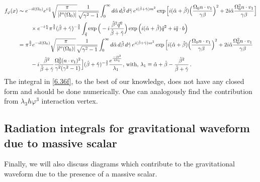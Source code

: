 \begin{align}
    \begin{split}
       f_{\varphi}(x)&\sim e^{-il(\Omega_0)}e^{i\frac{\pi}{4}}\sqrt{\frac{\pi}{|l''(\Omega_0)|}}\frac{1}{\sqrt{\gamma^2-1}}\int_0^\infty d\hat\alpha\,d\hat\beta\,d\hat\gamma \,e^{i(\hat\beta+\hat\gamma) m^2}\exp\Big[i(\hat\alpha+\hat\beta)\Big(\frac{\Omega_0 n\cdot v_1}{\gamma\beta}\Big)^2+2i\hat\alpha\frac{\Omega_0^2n\cdot v_1}{\gamma\beta}\Big]\\ &
       \hspace{0.8cm}\times  e^{-i\frac{\pi}{4}}\pi^{\frac{3}{2}}(\hat\beta+\hat\gamma)^{-\frac{3}{2}}\int_{\tilde q}\exp\Big(-i \frac{\hat\beta^2 \vec q^2}{\hat\beta +\hat\gamma}\Big)\exp\Big(i(\hat\alpha +\hat\beta)\tilde q^2+i\tilde q\cdot b\Big)\\ &
       = \pi^{\frac{5}{2}}e^{-il(\Omega_0)}\sqrt{\frac{\pi}{|l''(\Omega_0)|}}\frac{1}{\sqrt{\gamma^2-1}}\int_0^\infty d\hat\alpha\,d\hat\beta\,d\hat\gamma \,e^{i(\hat\beta+\hat\gamma) m^2}\exp\Big[i(\hat\alpha+\hat\beta)\Big(\frac{\Omega_0 n\cdot v_1}{\gamma\beta}\Big)^2+2i\hat\alpha\frac{\Omega_0^2n\cdot v_1}{\gamma\beta}\\ &
       \hspace{0.8cm}-i\frac{\hat\beta^2}{\hat\beta+\hat\gamma}\frac{\Omega_0^2(n\cdot v_1)^2}{\gamma^2(\gamma^2-1)}\Big]  (\hat\beta+\hat\gamma)^{-\frac{3}{2}}\frac{e^{\frac{-ib^2}{4\lambda_1}}}{\lambda_1},\,\textrm{with},\,\lambda_1\equiv \hat\alpha+\hat\beta-\frac{\hat\beta^2}{\hat\beta+\hat\gamma}\,.\label{6.36f}
    \end{split}
\end{align}
The integral in \eqref{6.36f}, to the best of our knowledge, does not have any closed form and should be done numerically. One can analogously find the contribution from $\lambda_3 h\varphi^3$ interaction vertex.

\subsection*{Radiation integrals for gravitational waveform due to massive scalar}
Finally, we will also discuss diagrams which contribute to the gravitational waveform due to the presence of a massive scalar.

